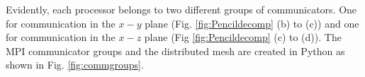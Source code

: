 \documentclass[11pt, oneside]{article}
\begin{document}
Evidently, each processor belongs to two different groups of communicators. One for communication in the $x-y$ plane (Fig. \ref{fig:Pencildecomp} (b) to (c)) and one for communication in the $x-z$ plane (Fig \ref{fig:Pencildecomp} (c) to (d)). The MPI communicator groups and the distributed mesh are created in Python as shown in Fig. \ref{fig:commgroups}.

\begin{figure}
\end{figure}
\end{document}
